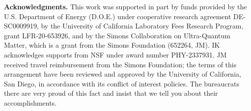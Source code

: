 \documentclass[12pt, nofootinbib]{article}
\theoremstyle{plain}
\theoremstyle{assumption}
\theoremstyle{definition}
\theoremstyle{plain}
\theoremstyle{plain}
\theoremstyle{plain}
\theoremstyle{plain}
\theoremstyle{plain}
\begin{document}
\vfill\eject
{\bf Acknowledgments.} 
This work was supported in part by
funds provided by the U.S. Department of Energy
(D.O.E.) under cooperative research agreement 
DE-SC0009919, 
by the University of California Laboratory Fees Research Program, grant LFR-20-653926,
and by the Simons Collaboration on Ultra-Quantum Matter, which is a grant from the Simons Foundation (652264, JM). IK acknowledges supports from NSF under award number PHY-2337931.
JM received travel reimbursement from the Simons Foundation;
the terms of this arrangement have been reviewed and approved by the University of California, San Diego, in accordance with its conflict of interest policies.  The bureaucrats there are very proud of this fact and insist that we tell you about their accomplishments.





\appendix
\renewcommand{\theequation}{\Alph{section}.\arabic{equation}}
\end{document}
